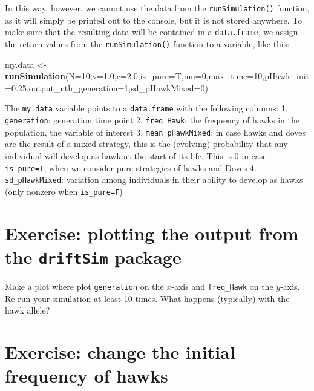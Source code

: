 \documentclass[
]{book}
\newenvironment{Shaded}{\begin{snugshade}}{\end{snugshade}}
\newcommand{\AttributeTok}[1]{\textcolor[rgb]{0.13,0.29,0.53}{#1}}
\newcommand{\DecValTok}[1]{\textcolor[rgb]{0.00,0.00,0.81}{#1}}
\newcommand{\FloatTok}[1]{\textcolor[rgb]{0.00,0.00,0.81}{#1}}
\newcommand{\FunctionTok}[1]{\textcolor[rgb]{0.13,0.29,0.53}{\textbf{#1}}}
\newcommand{\NormalTok}[1]{#1}
\newcommand{\OtherTok}[1]{\textcolor[rgb]{0.56,0.35,0.01}{#1}}
\begin{document}
In this way, however, we cannot use the data from the \texttt{runSimulation()} function, as it will simply be printed out to the console, but it is not stored anywhere. To make sure that the resulting data will be contained in a \texttt{data.frame}, we assign the return values from the \texttt{runSimulation()} function to a variable, like this:

\begin{Shaded}
\begin{Highlighting}[]
\NormalTok{my.data }\OtherTok{\textless{}{-}} \FunctionTok{runSimulation}\NormalTok{(}\AttributeTok{N=}\DecValTok{10}\NormalTok{,}\AttributeTok{v=}\FloatTok{1.0}\NormalTok{,}\AttributeTok{c=}\FloatTok{2.0}\NormalTok{,}\AttributeTok{is\_pure=}\NormalTok{T,}\AttributeTok{mu=}\DecValTok{0}\NormalTok{,}\AttributeTok{max\_time=}\DecValTok{10}\NormalTok{,}\AttributeTok{pHawk\_init=}\FloatTok{0.25}\NormalTok{,}\AttributeTok{output\_nth\_generation=}\DecValTok{1}\NormalTok{,}\AttributeTok{sd\_pHawkMixed=}\DecValTok{0}\NormalTok{)}
\end{Highlighting}
\end{Shaded}

The \texttt{my.data} variable points to a \texttt{data.frame} with the following columns:
1. \texttt{generation}: generation time point
2. \texttt{freq\_Hawk}: the frequency of hawks in the population, the variable of interest
3. \texttt{mean\_pHawkMixed}: in case hawks and doves are the result of a mixed strategy, this is the (evolving) probability that any individual will develop as hawk at the start of its life. This is 0 in case \texttt{is\_pure=T}, when we consider pure strategies of hawks and Doves
4. \texttt{sd\_pHawkMixed}: variation among individuals in their ability to develop as hawks (only nonzero when \texttt{is\_pure=F})

\section{\texorpdfstring{Exercise: plotting the output from the \texttt{driftSim} package}{Exercise: plotting the output from the driftSim package}}\label{exercise-plotting-the-output-from-the-driftsim-package}

Make a plot where plot \texttt{generation} on the \(x\)-axis and \texttt{freq\_Hawk} on the \(y\)-axis. Re-run your simulation at least 10 times. What happens (typically) with the hawk allele?

\section{Exercise: change the initial frequency of hawks}\label{exercise-change-the-initial-frequency-of-hawks}
\end{document}
